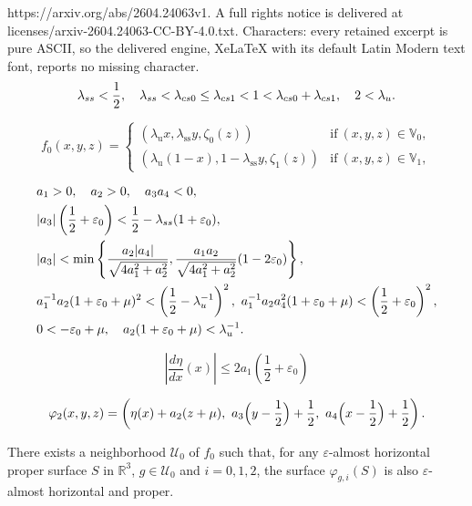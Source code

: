\documentclass[10pt,a4paper]{amsart}
\begin{document}
https://arxiv.org/abs/2604.24063v1. A full rights notice is delivered at licenses/arxiv-2604.24063-CC-BY-4.0.txt. Characters: every retained excerpt is pure ASCII, so the delivered engine, XeLaTeX with its default Latin Modern text font, reports no missing character.
\begin{equation}\label{eqn_eigen_v}
\lambda_{\rm ss}<\frac12,\quad
\lambda_{\rm ss}<\lambda_{\rm cs0}\leq \lambda_{\rm cs1}<1<\lambda_{\rm cs0}+\lambda_{\rm cs1},\quad 2<\lambda_{\rm u}.
\end{equation}

\begin{equation}\label{eqn_f0V}
f_{0}(x,y,z)=
\begin{cases}
(\lambda_{\mathrm{u}}x,\lambda_{\mathrm{ss}}y,\zeta_0(z))&\text{if}\ (x,y,z)\in \mathbb{V}_{0},\\
(\lambda_{\mathrm{u}}(1-x),1-\lambda_{\mathrm{ss}}y,\zeta_1(z)) &\text{if}\ (x,y,z)\in \mathbb{V}_{1},
\end{cases}
\end{equation} 

\begin{align}
&a_{1}>0,\quad a_2>0,\quad a_3a_4<0,\label{eqn_aaa}\\
&|a_{3}|\left(\frac12+\varepsilon_0\right)<\frac12-\lambda_{\rm ss}(1+\varepsilon_0),\label{eqn_|a3|}\\
&|a_3|<\min\left\{\dfrac{a_2|a_4|}{\sqrt{4a_1^2+a_2^2}},\dfrac{a_1a_2}{\sqrt{4a_1^2+a_2^2}}(1-2\varepsilon_0)\right\},\label{eqn_min}\\
&a_1^{-1}a_2(1+\varepsilon_0+\mu)^2<\left(\frac12-\lambda_{\rm u}^{-1}\right)^2,\  
a_1^{-1}a_2a_4^2(1+\varepsilon_0+\mu)<\left(\frac12+\varepsilon_0\right)^2,\label{eqn_a42}\\
&0<-\varepsilon_0+\mu,\quad a_2(1+\varepsilon_0+\mu)<\lambda_{\rm u}^{-1}.\label{eqn_e_0mu}
\end{align}

\begin{equation}\label{eqn_d_eta}
\left|\frac{d\eta}{dx}(x)\right|\leq 2a_1\left(\frac12+\varepsilon_0\right)
\end{equation}

\begin{equation}\label{eqn_phi_2}
\varphi_{2}(x,y,z)=\left(\eta(x)+a_{2}(z+\mu),\ a_{3}\Bigl(y-\frac{1}{2}\Bigr)+\frac{1}{2},\ 
a_{4}\Bigl(x-\frac{1}{2}\Bigr)+\frac{1}{2} \right).
\end{equation}

\begin{lem}\label{l_ea_horizontal}
There exists a neighborhood $\mathcal{U}_0$ of $f_0$ such that, 
for any $\varepsilon$-almost horizontal proper surface $S$ in $\mathbb{R}^3$, $g\in\mathcal{U}_0$ and $i=0,1,2$, 
the surface 
$\varphi_{g,i}(S)$ is also $\varepsilon$-almost horizontal and proper.
\end{lem}
\end{document}
